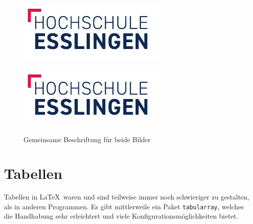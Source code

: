 \begin{figure}[htb!]
  \centering
  \begin{minipage}[t]{0.45\textwidth}
    \centering
    \includegraphics[width=\textwidth]{figures/hs-esslingen-logo}
    \label{fig:example1}
  \end{minipage}%
  \hfill
  \begin{minipage}[t]{0.45\textwidth}
    \centering
    \includegraphics[width=\textwidth]{figures/hs-esslingen-logo}
    \label{fig:example2}
  \end{minipage}
  \caption{Gemeinsame Beschriftung für beide Bilder}
  \label{fig:combined}
\end{figure}





\section*{Tabellen}

Tabellen in \LaTeX\ waren und sind teilweise immer noch schwieriger zu
gestalten, als in anderen Programmen. Es gibt mittlerweile ein Paket
\texttt{tabularray}, welches die Handhabung sehr erleichtert und viele
Konfigurationsmöglichkeiten bietet.

